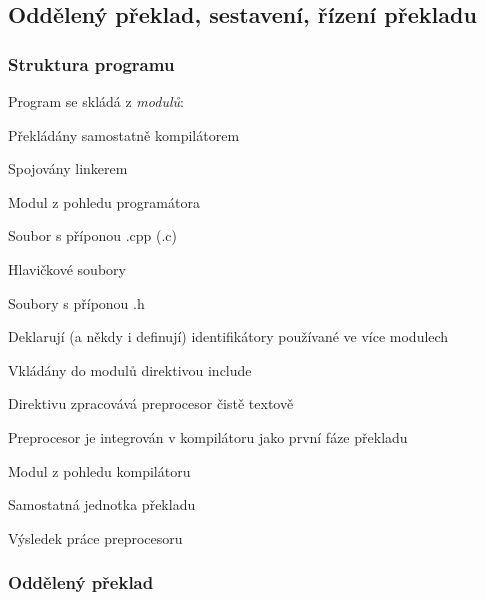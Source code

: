\subsection{Oddělený překlad, sestavení, řízení překladu}

\subsubsection*{Struktura programu}

Program se skládá z \emph{modulů}:
\begin{pitemize}
	\item Překládány samostatně kompilátorem 
	\item Spojovány linkerem
\end{pitemize}
Modul z pohledu programátora
\begin{pitemize}
	\item Soubor s příponou .cpp (.c)
\end{pitemize}
Hlavičkové soubory
\begin{pitemize}
	\item Soubory s příponou .h
	\item Deklarují (a někdy i definují) identifikátory používané ve více modulech
	\item Vkládány do modulů direktivou include
	\begin{pitemize}
		\item Direktivu zpracovává preprocesor čistě textově
		\item Preprocesor je integrován v kompilátoru jako první fáze překladu
	\end{pitemize}
\end{pitemize}
Modul z pohledu kompilátoru
\begin{pitemize}
	\item Samostatná jednotka překladu
	\item Výsledek práce preprocesoru
\end{pitemize}

\subsubsection*{Oddělený překlad}

